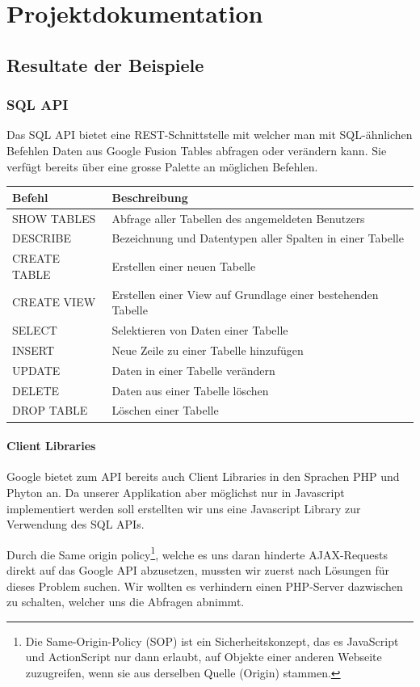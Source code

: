 \chapter{Projektdokumentation}

\section{Resultate der Beispiele}

\subsection{SQL API}
Das SQL API bietet eine REST-Schnittstelle mit welcher man mit SQL-ähnlichen Befehlen Daten aus Google Fusion Tables abfragen oder verändern kann. Sie verfügt bereits über eine grosse Palette an möglichen Befehlen.

\begin{tabular}{|l|l|}
\hline 
Befehl & Beschreibung \\ 
\hline 
SHOW TABLES & Abfrage aller Tabellen des angemeldeten Benutzers \\ 
\hline 
DESCRIBE & Bezeichnung und Datentypen aller Spalten in einer Tabelle \\ 
\hline 
CREATE TABLE & Erstellen einer neuen Tabelle \\ 
\hline 
CREATE VIEW & Erstellen einer View auf Grundlage einer bestehenden Tabelle \\ 
\hline 
SELECT & Selektieren von Daten einer Tabelle \\ 
\hline 
INSERT & Neue Zeile zu einer Tabelle hinzufügen \\ 
\hline 
UPDATE & Daten in einer Tabelle verändern \\ 
\hline 
DELETE & Daten aus einer Tabelle löschen \\ 
\hline 
DROP TABLE & Löschen einer Tabelle \\ 
\hline 
\end{tabular}

\subsubsection{Client Libraries}
Google bietet zum API bereits auch Client Libraries in den Sprachen PHP und Phyton an. Da unserer Applikation aber möglichst nur in Javascript implementiert werden soll erstellten wir uns eine Javascript Library zur Verwendung des SQL APIs.

Durch die Same origin policy\footnote{Die Same-Origin-Policy (SOP) ist ein Sicherheitskonzept, das es JavaScript und ActionScript nur dann erlaubt, auf Objekte einer anderen Webseite zuzugreifen, wenn sie aus derselben Quelle (Origin) stammen.\cite{sop} }, welche es uns daran hinderte AJAX-Requests direkt auf das Google API abzusetzen, mussten wir zuerst nach Lösungen für dieses Problem suchen. Wir wollten es verhindern einen PHP-Server dazwischen zu schalten, welcher uns die Abfragen abnimmt.

